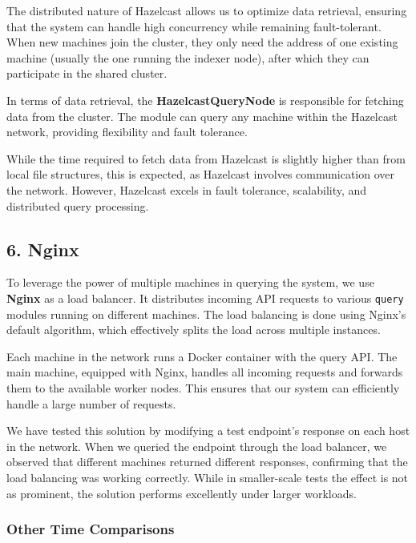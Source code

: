 The distributed nature of Hazelcast allows us to optimize data
retrieval, ensuring that the system can handle high concurrency while
remaining fault-tolerant. When new machines join the cluster, they only
need the address of one existing machine (usually the one running the
indexer node), after which they can participate in the shared cluster.

In terms of data retrieval, the \textbf{HazelcastQueryNode} is
responsible for fetching data from the cluster. The module can query any
machine within the Hazelcast network, providing flexibility and fault
tolerance.

While the time required to fetch data from Hazelcast is slightly higher
than from local file structures, this is expected, as Hazelcast involves
communication over the network. However, Hazelcast excels in fault
tolerance, scalability, and distributed query processing.

\hypertarget{nginx}{%
\subsection{6. Nginx}\label{nginx}}

To leverage the power of multiple machines in querying the system, we
use \textbf{Nginx} as a load balancer. It distributes incoming API
requests to various \texttt{query} modules running on different
machines. The load balancing is done using Nginx's default algorithm,
which effectively splits the load across multiple instances.

Each machine in the network runs a Docker container with the query API.
The main machine, equipped with Nginx, handles all incoming requests and
forwards them to the available worker nodes. This ensures that our
system can efficiently handle a large number of requests.

We have tested this solution by modifying a test endpoint's response on
each host in the network. When we queried the endpoint through the load
balancer, we observed that different machines returned different
responses, confirming that the load balancing was working correctly.
While in smaller-scale tests the effect is not as prominent, the
solution performs excellently under larger workloads.

\hypertarget{other-time-comparisons}{%
\subsubsection{Other Time Comparisons}\label{other-time-comparisons}}

